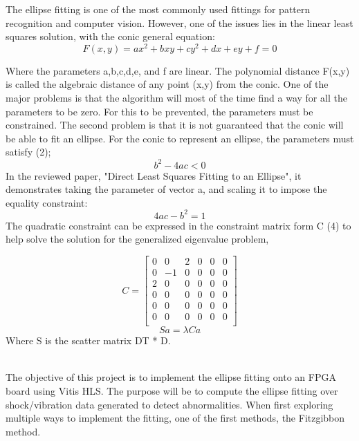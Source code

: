 
The ellipse fitting is one of the most commonly used fittings for pattern recognition and computer vision. However, one of the issues lies in the linear least squares solution, with the conic general equation:
\begin{equation}
F(x,y) = ax^{2} + bxy + cy^{2} + dx + ey + f = 0   
\end{equation}

Where the parameters a,b,c,d,e, and f are linear. The polynomial distance F(x,y) is called the algebraic distance of any point (x,y) from the conic. One of the major problems is that the algorithm will most of the time find a way for all the parameters to be zero. For this to be prevented, the parameters must be constrained. The second problem is that it is not guaranteed that the conic will be able to fit an ellipse. For the conic to represent an ellipse, the parameters must satisfy (2);
\begin{equation}
    b^{2} - 4ac < 0
\end{equation}
In the reviewed paper, "Direct Least Squares Fitting to an Ellipse", it demonstrates taking the parameter of vector a, and scaling it to impose the equality constraint:
\begin{equation}
    4ac - b^{2} = 1
\end{equation}
The quadratic constraint can be expressed in the constraint matrix form C (4) to help solve the solution for the generalized eigenvalue problem,

\begin{equation}
    C = 
\begin{bmatrix}
0 & 0 & 2 & 0 & 0 & 0 \\
0 & -1 & 0 & 0 & 0 & 0 \\ 
2 & 0 & 0 & 0 & 0 & 0 \\ 
0 & 0 & 0 & 0 & 0 & 0 \\ 
0 & 0 & 0 & 0 & 0 & 0 \\ 
0 & 0 & 0 & 0 & 0 & 0 \\
\end{bmatrix}
\end{equation}
\begin{equation}
    Sa = \lambda Ca
\end{equation}
Where S is the scatter matrix DT * D.

\\The objective of this project is to implement the ellipse fitting onto an FPGA board using Vitis HLS. The purpose will be to compute the ellipse fitting over shock/vibration data generated to detect abnormalities. When first exploring multiple ways to implement the fitting, one of the first methods, the Fitzgibbon method.

